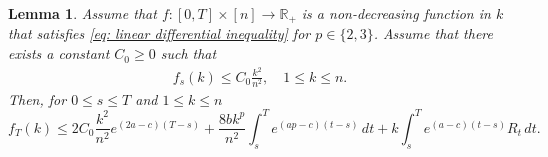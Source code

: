 \documentclass[11pt,reqno]{amsart}
\numberwithin{equation}{section}
\newtheorem{lemma}[theorem]{Lemma}
\theoremstyle{definition}
\def\R{{\mathbb R}}
\begin{document}
\begin{lemma}
  \label{lm: linear differential inequality}
  Assume that $f:[0,T]\times [n]\to \R_+$ is a non-decreasing function in $k$ that satisfies \eqref{eq: linear differential inequality} for $p\in\{2,3\}$. Assume that there exists a constant $C_0\geq 0$ such that 
  \begin{align}
  \label{eq: yule process initial condition}
      f_s(k)\leq C_0\frac{k^2}{n^2}, \quad 1 \le k \le n.
  \end{align}
  Then, for $0 \le s \le T$ and $1 \le k \le n$
    \begin{equation*}
        f_T(k)\leq 2C_0\frac{k^2}{n^2} e^{(2a-c)(T-s)}+\frac{8bk^p}{n^2}\int_s^T e^{(ap-c)(t-s)} \,dt + k\int_s^T e^{(a-c)(t-s)} R_t \,dt.
    \end{equation*}
\end{lemma}
\end{document}

